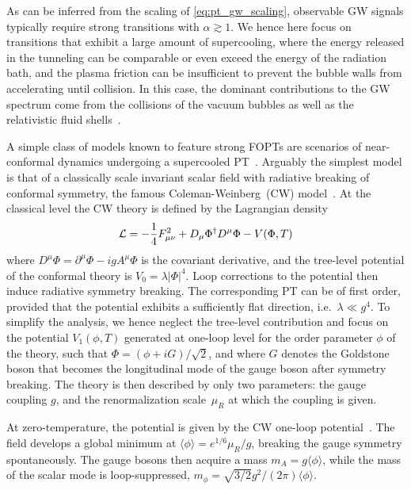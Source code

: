 \documentclass{article}
\begin{document}
As can be inferred from the scaling of \cref{eq:pt_gw_scaling}, observable GW signals typically require strong transitions with $\alpha \gtrsim 1$.
We hence here focus on transitions that exhibit a large amount of supercooling, where the energy released in the tunneling can be comparable or even exceed the energy of the radiation bath, and the plasma friction can be insufficient to prevent the bubble walls from accelerating until collision. 
In this case, the dominant contributions to the GW spectrum come from the collisions of the vacuum bubbles as well as the relativistic fluid shells~\cite{Lewicki:2022pdb}.

\bigskip 

A simple class of models known to feature strong FOPTs are scenarios of near-conformal dynamics undergoing a supercooled PT~\cite{Jinno:2016knw,Iso:2017uuu,Levi:2022bzt,Marzola:2017jzl,Azatov:2019png,Borah:2021ftr,Kierkla:2022odc,Freese:2022qrl,Sagunski:2023ynd}. Arguably the simplest model is that of a classically scale invariant scalar field with radiative breaking of conformal symmetry, the famous Coleman-Weinberg~(CW) model~\cite{Coleman:1973jx}.
At the classical level the CW theory is defined by the Lagrangian density
%
\begin{equation}
    {\cal L} = -\frac{1}{4}F^2_{\mu\nu}+D_{\mu}\Phi^\dagger D^{\mu}\Phi - V(\Phi,T)
\end{equation}
where $D^{\mu}\Phi=\partial^\mu\Phi-igA^\mu \Phi$ is the covariant derivative, and the tree-level potential of the conformal theory is $V_0 = \lambda |\Phi|^4$.
Loop corrections to the potential then induce radiative symmetry breaking.
The corresponding PT can be of first order, provided that the potential exhibits a sufficiently flat direction, i.e.\ $\lambda \ll g^4$.
To simplify the analysis, we hence neglect the tree-level contribution and focus on the potential $V_1(\phi,T)$ generated at one-loop level for the order parameter $\phi$ of the theory, such that $\Phi = (\phi + i G )/\sqrt{2}$, and where $G$ denotes the Goldstone boson that becomes the longitudinal mode of the gauge boson after symmetry breaking. 
The theory is then described by only two parameters: the gauge coupling $g$, and the renormalization scale~$\mu_R$ at which the coupling is given.

At zero-temperature, the potential is given by the CW one-loop potential~\cite{Coleman:1973jx}. 
The field develops a global minimum at $\langle\phi\rangle= e^{1/6} \mu_R/g$, breaking the gauge symmetry spontaneously.
The gauge bosons then acquire a mass $m_A = g \langle\phi\rangle$, while the mass of the scalar mode is loop-suppressed, $m_\phi = \sqrt{3/2} g^2 / (2\pi) \langle\phi\rangle$.
\end{document}
